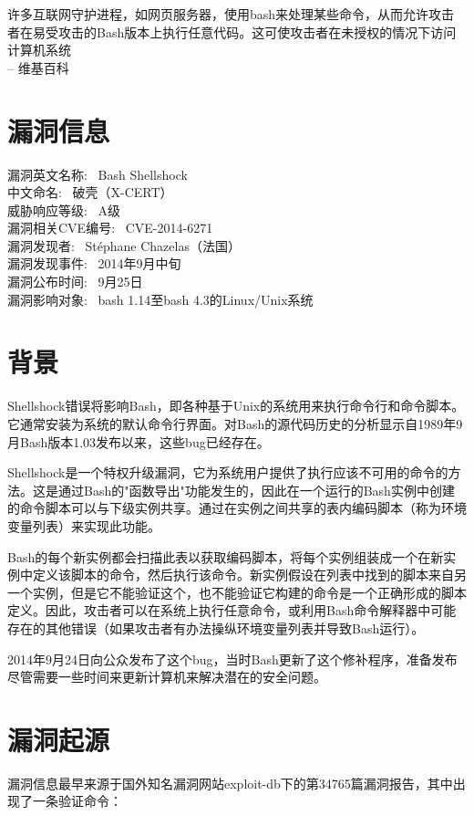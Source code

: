 \documentclass[11pt,journal,compsoc]{IEEEtran}
\begin{document}
\begin{CJK}{UTF8}{gkai}
许多互联网守护进程，如网页服务器，使用bash来处理某些命令，从而允许攻击者在易受攻击的Bash版本上执行任意代码。这可使攻击者在未授权的情况下访问计算机系统\\


\hfill -- 维基百科
 

\section{漏洞信息}
漏洞英文名称: ~Bash Shellshock\\
中文命名: ~破壳（X-CERT）\\
威胁响应等级: ~A级\\
漏洞相关CVE编号: ~CVE-2014-6271\\
漏洞发现者: ~Stéphane Chazelas（法国）\\
漏洞发现事件: ~2014年9月中旬\\
漏洞公布时间: ~9月25日\\
漏洞影响对象: ~bash 1.14至bash 4.3的Linux/Unix系统\\


\section{背景}
Shellshock错误将影响Bash，即各种基于Unix的系统用来执行命令行和命令脚本。它通常安装为系统的默认命令行界面。对Bash的源代码历史的分析显示自1989年9月Bash版本1.03发布以来，这些bug已经存在。

Shellshock是一个特权升级漏洞，它为系统用户提供了执行应该不可用的命令的方法。这是通过Bash的"函数导出"功能发生的，因此在一个运行的Bash实例中创建的命令脚本可以与下级实例共享。通过在实例之间共享的表内编码脚本（称为环境变量列表）来实现此功能。

Bash的每个新实例都会扫描此表以获取编码脚本，将每个实例组装成一个在新实例中定义该脚本的命令，然后执行该命令。新实例假设在列表中找到的脚本来自另一个实例，但是它不能验证这个，也不能验证它构建的命令是一个正确形成的脚本定义。因此，攻击者可以在系统上执行任意命令，或利用Bash命令解释器中可能存在的其他错误（如果攻击者有办法操纵环境变量列表并导致Bash运行）。

2014年9月24日向公众发布了这个bug，当时Bash更新了这个修补程序，准备发布尽管需要一些时间来更新计算机来解决潜在的安全问题。

\section{漏洞起源}
漏洞信息最早来源于国外知名漏洞网站exploit-db下的第34765篇漏洞报告，其中出现了一条验证命令：


\end{CJK}
\end{document}
